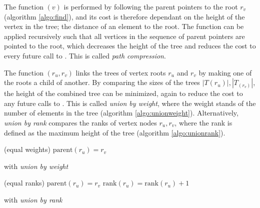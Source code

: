 The function $(v)$ is performed by following the parent pointers to the root $r_v$ (algorithm \ref{algo:find}), and its cost is therefore dependant on the height of the vertex in the tree; the distance of an element to the root. The function can be applied recursively such that all vertices in the sequence of parent pointers are pointed to the root, which decreases the height of the tree and reduces the cost to every future call to . This is called \emph{path compression}. 
\begin{algorithm}[htb]
  \BlankLine
  \BlankLine
  \BlankLine
  \caption{}\label{algo:find}
\end{algorithm}

The function $(r_u,r_v)$ links the trees of vertex roots $r_u$ and $r_v$ by making one of the roots a child of another. By comparing the sizes of the trees $|T(r_u)|, |T_(r_v)|$, the height of the combined tree can be minimized, again to reduce the cost to any future calls to . This is called \emph{union by weight}, where the weight stands of the number of elements in the tree (algorithm \ref{algo:unionweight}). Alternatively, \emph{union by rank} compares the ranks of vertex nodes $r_u,r_v$, where the rank is defined as the maximum height of the tree (algorithm \ref{algo:unionrank}).
\begin{algorithm}[htb]
  \BlankLine
  \BlankLine
  \Else(equal weights){
    $\text{parent}(r_u)=r_v$ \;
  }
  \BlankLine
  \caption{ with \emph{union by weight}}\label{algo:unionweight}
\end{algorithm}

\begin{algorithm}[htb]
  \BlankLine
  \BlankLine
  \Else(equal ranks){
    $\text{parent}(r_u)=r_v$ \;
    $\text{rank}(r_u) = \text{rank}(r_u) + 1$ \;
  }
  \BlankLine
  \caption{ with \emph{union by rank}}\label{algo:unionrank}
\end{algorithm}

